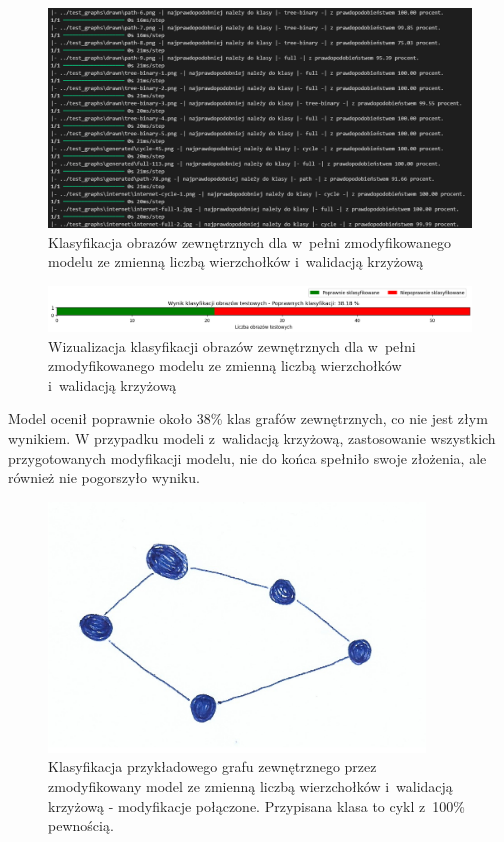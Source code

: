 \begin{figure}[ht]
	\centering
	\includegraphics[width=14cm]{resources/tests/images/v4/multiple_edges_crossvalid_txt.png}
	\caption{Klasyfikacja obrazów zewnętrznych dla w~pełni zmodyfikowanego modelu ze zmienną liczbą wierzchołków i~walidacją krzyżową}
	\label{Fig:tests-csvar-2b}
\end{figure}
\FloatBarrier

\begin{figure}[ht]
	\centering
	\includegraphics[width=14cm]{resources/tests/images/v4/multiple_edges_crossvalid_bar.png}
	\caption{Wizualizacja klasyfikacji obrazów zewnętrznych dla w~pełni zmodyfikowanego modelu ze zmienną liczbą wierzchołków i~walidacją krzyżową}
	\label{Fig:tests-csvar-2c}
\end{figure}
\FloatBarrier

Model ocenił poprawnie około 38\% klas grafów zewnętrznych, co nie jest złym wynikiem.
W przypadku modeli z~walidacją krzyżową, zastosowanie wszystkich przygotowanych modyfikacji modelu,
nie do końca spełniło swoje złożenia, ale również nie pogorszyło wyniku.

\begin{figure}[ht]
	\centering
	\includegraphics[width=10cm]{../graph_classification/test_graphs/drawn/cycle-2.png}
	\caption{Klasyfikacja przykładowego grafu zewnętrznego przez zmodyfikowany model
		ze zmienną liczbą wierzchołków i~walidacją krzyżową - modyfikacje połączone.
		Przypisana klasa to cykl z~100\% pewnością.}
	\label{Fig:tests-cv-2d}
\end{figure}
\FloatBarrier
